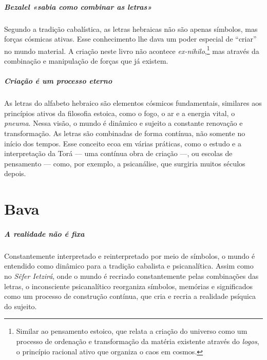 \paragraph{Bezalel «sabia como combinar as letras»} Segundo a tradição cabalística, as letras hebraicas não são apenas símbolos, mas forças cósmicas ativas. Esse conhecimento lhe dava um poder especial de ``criar'' no mundo material. A criação neste livro não acontece \textit{ex-nihilo},\footnote{Similar ao pensamento estoico, que relata a criação do universo como um processo de ordenação e transformação da matéria existente através do \textit{logos}, o princípio racional ativo que organiza o caos em cosmos.} mas através da combinação e manipulação de forças que já existem. 

\paragraph{Criação é um processo eterno} As letras do alfabeto hebraico são elementos cósmicos fundamentais, similares aos princípios ativos da filosofia estoica, como o fogo, o ar e a energia vital, o \textit{pneuma}. Nessa visão, o mundo é dinâmico e sujeito a constante renovação e transformação. As letras são combinadas de forma contínua, não somente no início dos tempos. Esse conceito ecoa em várias práticas, como o estudo e a interpretação da Torá --- uma contínua obra de criação ---, ou escolas de pensamento --- como, por exemplo, a psicanálise, que surgiria muitos séculos depois.

\chapter*{Bava \smallskip{}}

\begin{center}
{\huge{}}
\end{center}

\paragraph{A realidade não é fixa} Constantemente interpretado e reinterpretado por meio de símbolos, o mundo é entendido como dinâmico para a tradição cabalista e psicanalítica. Assim como no \textit{Sêfer Ietzirá}, onde o mundo é recriado constantemente pelas combinações das letras, o inconsciente psicanalítico reorganiza símbolos, memórias e significados como um processo de construção contínua, que cria e recria a realidade psíquica do sujeito. 

